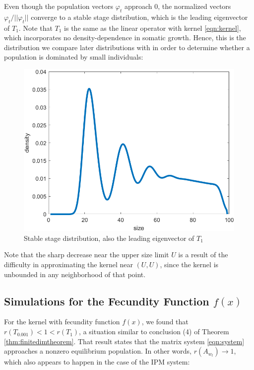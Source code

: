 Even though the population vectors $\varphi_t$ approach 0, the normalized vectors $\varphi_t / || \varphi_t||$ converge to a stable stage distribution, which is the leading eigenvector of $T_1$. Note that $T_1$ is the same as the linear operator with kernel \ref{eqn:kernel}, which incorporates no density-dependence in somatic growth. Hence, this is the distribution we compare later distributions with in order to determine whether a population is dominated by small individuals:

\begin{figure}[H]
	\centering
	\includegraphics[width=0.7\linewidth]{Images/F=0.05/ssd_when_f=0.05}
	\caption{Stable stage distribution, also the leading eigenvector of $T_1$}
	\label{fig:ssdwhenf=0.05}
\end{figure}

Note that the sharp decrease near the upper size limit $U$ is a result of the difficulty in approximating the kernel near $(U,U)$, since the kernel is unbounded in any neighborhood of that point.

\subsection{Simulations for the Fecundity Function $f(x)$} \label{subsec:f(x)}

For the kernel with fecundity function $f(x)$, we found that $r(T_{0.001}) < 1 < r(T_1)$, a situation similar to conclusion (4) of Theorem \ref{thm:finitedimtheorem}. That result states that the matrix system \eqref{eqn:system} approaches a nonzero equilibrium population. In other words, $r(A_{w_t}) \to 1$, which also appears to happen in the case of the IPM system:

